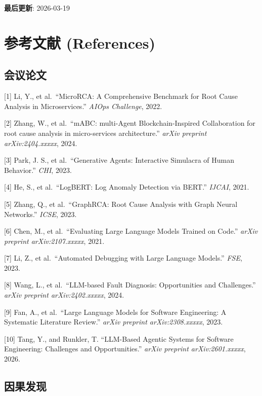\textbf{最后更新}: 2026-03-19

\hypertarget{ux53c2ux8003ux6587ux732e-references}{%
\section{参考文献
(References)}\label{ux53c2ux8003ux6587ux732e-references}}

\hypertarget{ux4f1aux8baeux8bbaux6587}{%
\subsection{会议论文}\label{ux4f1aux8baeux8bbaux6587}}

{[}1{]} Li, Y., et al.~``MicroRCA: A Comprehensive Benchmark for Root
Cause Analysis in Microservices.'' \emph{AIOps Challenge}, 2022.

{[}2{]} Zhang, W., et al.~``mABC: multi-Agent Blockchain-Inspired
Collaboration for root cause analysis in micro-services architecture.''
\emph{arXiv preprint arXiv:2404.xxxxx}, 2024.

{[}3{]} Park, J. S., et al.~``Generative Agents: Interactive Simulacra
of Human Behavior.'' \emph{CHI}, 2023.

{[}4{]} He, S., et al.~``LogBERT: Log Anomaly Detection via BERT.''
\emph{IJCAI}, 2021.

{[}5{]} Zhang, Q., et al.~``GraphRCA: Root Cause Analysis with Graph
Neural Networks.'' \emph{ICSE}, 2023.

{[}6{]} Chen, M., et al.~``Evaluating Large Language Models Trained on
Code.'' \emph{arXiv preprint arXiv:2107.xxxxx}, 2021.

{[}7{]} Li, Z., et al.~``Automated Debugging with Large Language
Models.'' \emph{FSE}, 2023.

{[}8{]} Wang, L., et al.~``LLM-based Fault Diagnosis: Opportunities and
Challenges.'' \emph{arXiv preprint arXiv:2402.xxxxx}, 2024.

{[}9{]} Fan, A., et al.~``Large Language Models for Software
Engineering: A Systematic Literature Review.'' \emph{arXiv preprint
arXiv:2308.xxxxx}, 2023.

{[}10{]} Tang, Y., and Runkler, T. ``LLM-Based Agentic Systems for
Software Engineering: Challenges and Opportunities.'' \emph{arXiv
preprint arXiv:2601.xxxxx}, 2026.

\hypertarget{ux56e0ux679cux53d1ux73b0}{%
\subsection{因果发现}\label{ux56e0ux679cux53d1ux73b0}}

